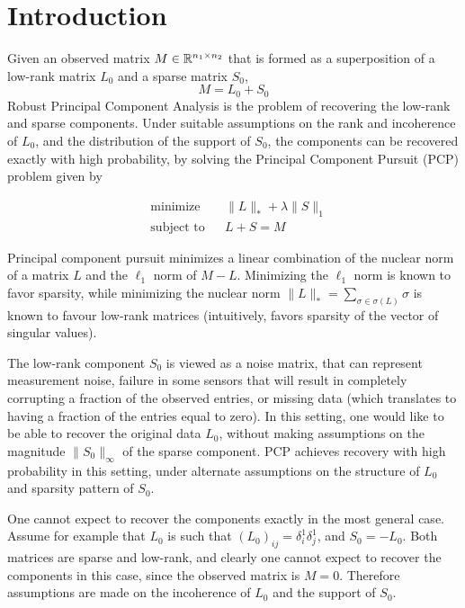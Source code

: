 
\section{Introduction}
Given an observed matrix $M \in {\mathbb R}^{n_1 \times n_2}$ that is formed as a superposition of a low-rank matrix $L_0$ and a sparse matrix $S_0$,
\[
M = L_0 + S_0
\]
Robust Principal Component Analysis \cite{Candes:2011fk} is the problem of recovering the low-rank and sparse components. Under suitable assumptions on the rank and incoherence of $L_0$, and the distribution of the support of $S_0$, the components can be recovered exactly with high probability, by solving the Principal Component Pursuit (PCP) problem given by

\begin{equation}
\begin{aligned}
&\text{minimize} && \|L\|_* + \lambda \|S\|_1 \\
&\text{subject to} && L+S = M
\label{eq:pcp}
\end{aligned}
\end{equation}

Principal component pursuit minimizes a linear combination of the nuclear norm of a matrix $L$ and the $\ell_1$ norm of $M-L$. Minimizing the $\ell_1$ norm is known to favor sparsity, while minimizing the nuclear norm $\|L\|_* = \sum_{\sigma \in \sigma(L)} \sigma$ is known to favour low-rank matrices (intuitively, favors sparsity of the vector of singular values).

The low-rank component $S_0$ is viewed as a noise matrix, that can represent measurement noise, failure in some sensors that will result in completely corrupting a fraction of the observed entries, or missing data (which translates to having a fraction of the entries equal to zero). In this setting, one would like to be able to recover the original data $L_0$, without making assumptions on the magnitude $\|S_0\|_\infty$ of the sparse component. PCP achieves recovery with high probability in this setting, under alternate assumptions on the structure of $L_0$ and sparsity pattern of $S_0$.

One cannot expect to recover the components exactly in the most general case. Assume for example that $L_0$ is such that $(L_0)_{ij} = \delta_i^1\delta_j^1$, and $S_0 = -L_0$. Both matrices are sparse and low-rank, and clearly one cannot expect to recover the components in this case, since the observed matrix is $M = 0$. Therefore assumptions are made on the incoherence of $L_0$ and the support of $S_0$.


